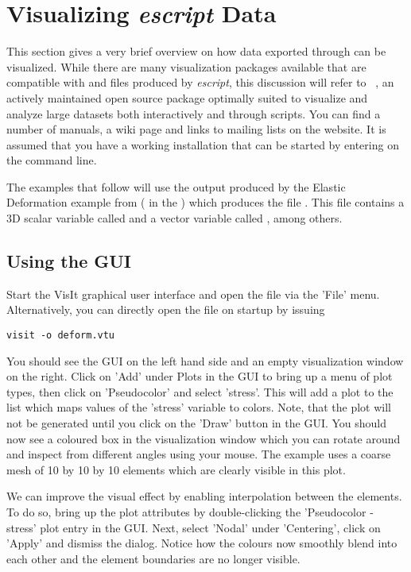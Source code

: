 \section{Visualizing {\it escript} Data}
This section gives a very brief overview on how data exported through \weipa
can be visualized. While there are many visualization packages available that
are compatible with \VTK and \SILO files produced by {\it escript}, this
discussion will refer to \VisIt~\cite{VisIt}, an actively maintained open
source package optimally suited to visualize and analyze large datasets both
interactively and through \PYTHON scripts. You can find a number of manuals,
a wiki page and links to mailing lists on the \VisIt website.
It is assumed that you have a working \VisIt installation that can be started
by entering  on the command line.

The examples that follow will use the output produced by the Elastic
Deformation example from  ( in the
\ExampleDirectory) which produces the file .
This \VTK file contains a 3D scalar variable called  and a vector
variable called , among others.

\subsection{Using the \VisIt GUI}
Start the VisIt graphical user interface and open the file 
via the 'File' menu. Alternatively, you can directly open the file on startup
by issuing
\begin{verbatim}
visit -o deform.vtu
\end{verbatim}
You should see the \VisIt GUI on the left hand side and an empty visualization
window on the right. Click on 'Add' under Plots in the GUI to bring up a menu
of plot types, then click on 'Pseudocolor' and select 'stress'.
This will add a plot to the list which maps values of the 'stress' variable to
colors. Note, that the plot will not be generated until you click on the 'Draw'
button in the GUI. You should now see a coloured box in the visualization
window which you can rotate around and inspect from different angles using your
mouse. The example uses a coarse mesh of 10 by 10 by 10 elements which are
clearly visible in this plot.

We can improve the visual effect by enabling interpolation between the elements.
To do so, bring up the plot attributes by double-clicking the
'Pseudocolor - stress' plot entry in the GUI.
Next, select 'Nodal' under 'Centering', click on 'Apply' and dismiss the dialog.
Notice how the colours now smoothly blend into each other and the element
boundaries are no longer visible.

